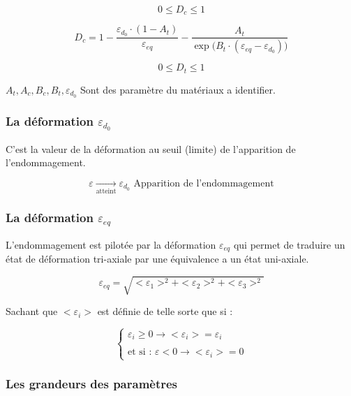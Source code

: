 \documentclass[12pt,a4paper]{report}
\renewcommand{\leq}{\leqslant}
\renewcommand{\geq}{\geqslant}
\begin{document}
	\[ 0\leq D_{c} \leq 1 \]
	
	
	
	\[ D_{c} = 1 - \dfrac{\varepsilon_{d_{0}} \cdot (1 - A_{t})}{\varepsilon_{eq}}  - \dfrac{A_{t}}{\exp\bigg(B_{t} \cdot (\varepsilon_{eq} - \varepsilon_{d_{0}})\bigg)} \]
	
	
	\[ 0\leq D_{t} \leq 1 \]
	
	
	
	$A_{t},A_{c},B_{c},B_{t},\varepsilon_{d_{0}}$ Sont des paramètre du matériaux a identifier.
	
	
	
	
	\subsubsection{La déformation $\varepsilon_{d_{0}}$}
	
	C'est la valeur de la déformation au seuil (limite) de l'apparition de l'endommagement.
	
	\[ \varepsilon \underset{\text{atteint}}{\longrightarrow} \varepsilon_{d_{0}} \text{ Apparition de l'endommagement} \]
	
	
	
	\subsubsection{La déformation $\varepsilon_{eq}$}
	
	L'endommagement est pilotée par la déformation $\varepsilon_{eq}$ qui permet de traduire un état de déformation tri-axiale par une équivalence a un état uni-axiale.
	

	\[ \varepsilon_{eq} = \sqrt{<\varepsilon_{1}>^{2} + <\varepsilon_{2}>^{2} + <\varepsilon_{3}>^{2}} \]
	
	Sachant que $<\varepsilon_{i}>$ est définie de telle sorte que si :
	
	\[ \begin{cases}
		\varepsilon_{i} \geq 0 \rightarrow <\varepsilon_{i}> = \varepsilon_{i} \\ \\
		\text{et si : } \varepsilon < 0 \rightarrow <\varepsilon_{i}>  = 0
	\end{cases} \]
	
	
	
	
	
	\subsubsection{Les grandeurs des paramètres}
	
\end{document}
